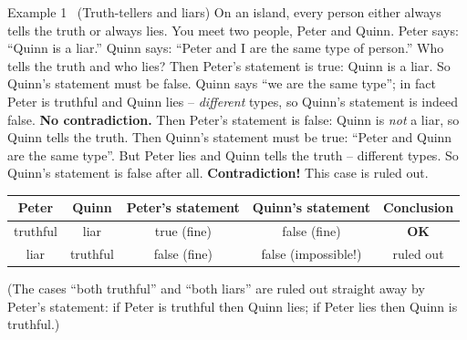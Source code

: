 \begin{exbox}{Example 1 \ (Truth-tellers and liars)}
On an island, every person either always tells the truth or always lies. You meet two people, Peter and Quinn.
Peter says: ``Quinn is a liar.'' Quinn says: ``Peter and I are the same type of person.''
Who tells the truth and who lies?
\guide
{}
Then Peter's statement is true: Quinn is a liar. So Quinn's statement must be false. Quinn says ``we are the same type''; in fact
Peter is truthful and Quinn lies -- \emph{different} types, so Quinn's statement is indeed false. \textbf{No contradiction.}
Then Peter's statement is false: Quinn is \emph{not} a liar, so Quinn tells the truth. Then Quinn's statement must be true: ``Peter and
Quinn are the same type''. But Peter lies and Quinn tells the truth -- different types. So Quinn's statement is false after all.
\textbf{Contradiction!} This case is ruled out.
\begin{center}
\begin{tabular}{|c|c|c|c|c|}
\hline
\rowcolor{tmBlue!10} Peter & Quinn & Peter's statement & Quinn's statement & Conclusion \\ \hline
truthful & liar & true (fine) & false (fine) & \textcolor{tmGreen!70!black}{\textbf{OK}} \\ \hline
liar & truthful & false (fine) & false (impossible!) & \textcolor{AnsRed}{ruled out} \\ \hline
\end{tabular}
\end{center}
(The cases ``both truthful'' and ``both liars'' are ruled out straight away by Peter's statement: if Peter is truthful then Quinn lies;
if Peter lies then Quinn is truthful.)
\end{exbox}

